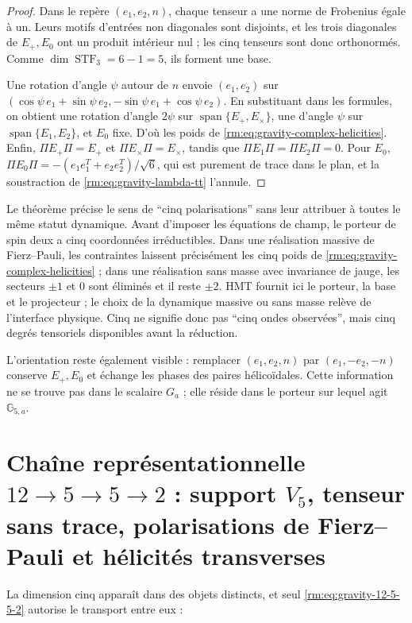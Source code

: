 \begin{proof}
Dans le repère \((e_1,e_2,n)\), chaque tenseur a une norme de Frobenius égale à un.
Leurs motifs d’entrées non diagonales sont disjoints, et les trois diagonales
de \(E_+,E_0\) ont un produit intérieur nul ; les cinq tenseurs
sont donc orthonormés. Comme \(\dim\operatorname{STF}_3=6-1=5\), ils forment une base.

Une rotation d’angle \(\psi\) autour de \(n\) envoie
\((e_1,e_2)\) sur
\((\cos\psi\,e_1+\sin\psi\,e_2,
-\sin\psi\,e_1+\cos\psi\,e_2)\). En substituant dans les formules, on obtient
une rotation d’angle \(2\psi\) sur
\(\operatorname{span}\{E_+,E_\times\}\), une d’angle \(\psi\) sur
\(\operatorname{span}\{E_1,E_2\}\), et \(E_0\) fixe. D’où les poids de
\cref{rm:eq:gravity-complex-helicities}. Enfin,
\(\Pi E_{+}\Pi=E_+\) et \(\Pi E_\times\Pi=E_\times\), tandis que
\(\Pi E_1\Pi=\Pi E_2\Pi=0\). Pour \(E_0\),
\(\Pi E_0\Pi=-(e_1e_1^T+e_2e_2^T)/\sqrt6\), qui est purement de trace dans
le plan, et la soustraction de \cref{rm:eq:gravity-lambda-tt} l’annule.
\end{proof}

Le théorème précise le sens de ``cinq polarisations'' sans leur attribuer
à toutes le même statut dynamique. Avant d’imposer les équations de champ,
le porteur de spin deux a cinq coordonnées irréductibles. Dans une
réalisation massive de Fierz--Pauli, les contraintes laissent précisément
les cinq poids de \cref{rm:eq:gravity-complex-helicities} ; dans une réalisation
sans masse avec invariance de jauge, les secteurs \(\pm1\) et \(0\) sont éliminés et
il reste \(\pm2\). HMT fournit ici le porteur, la base et le projecteur ;
le choix de la dynamique massive ou sans masse relève de l’interface
physique. Cinq ne signifie donc pas ``cinq ondes observées'', mais cinq
degrés tensoriels disponibles avant la réduction.

L’orientation reste également visible : remplacer
\((e_1,e_2,n)\) par \((e_1,-e_2,-n)\) conserve \(E_+,E_0\) et échange
les phases des paires hélicoïdales. Cette information ne se trouve pas dans le
scalaire \(G_a\) ; elle réside dans le porteur sur lequel agit
\(\mathbb G_{5,a}\).

\section{Chaîne représentationnelle \(12\to5\to5\to2\) : support \(V_5\), tenseur sans trace, polarisations de Fierz–Pauli et hélicités transverses}

La dimension cinq apparaît dans des objets distincts, et seul
\cref{rm:eq:gravity-12-5-5-2} autorise le transport entre eux :


